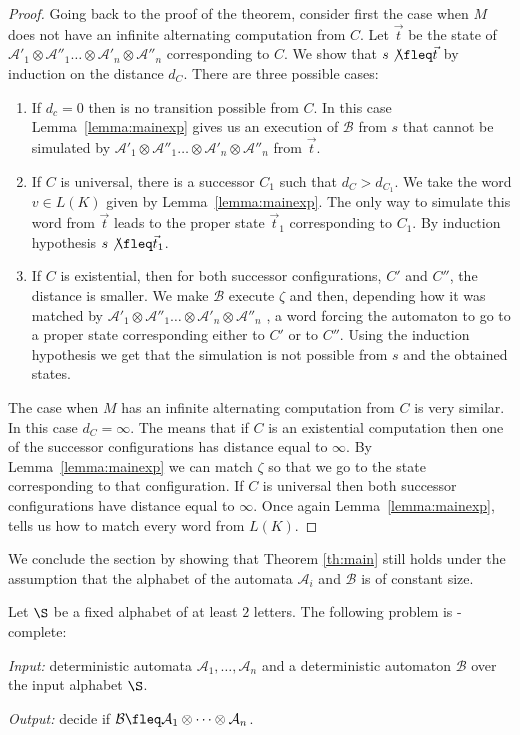 \documentclass{LMCS}
\theoremstyle{plain}\newtheorem{remark}{Remark}
\theoremstyle{plain}\newtheorem{lemma}[thm]{Lemma}
\renewcommand{\Aa}{\mathcal{A}}
\renewcommand{\Bb}{\mathcal{B}}
\newcommand{\vect}{\vec t}
\newcommand{\vAap}{\Aa'_1\otimes\Aa''_1\dots\otimes\Aa'_n\otimes\Aa''_n}
\newcommand{\choice}{\zeta}
\begin{document}
\begin{proof}
  Going back to the proof of the theorem, consider first the case when
  $M$ does not have an infinite alternating computation from $C$. Let
  $\vect$ be the state of $\vAap$ corresponding to $C$.  We show that
  $s\not\fleq \vect$ by induction on the distance $d_C$. There are
  three possible cases:
  \begin{enumerate}[$\bullet$]
  \item If $d_c=0$ then is no transition possible from $C$. In this case 
    Lemma~\ref{lemma:mainexp} gives us an execution of $\Bb$ from $s$ that
    cannot be simulated by $\vAap$ from $\vect$.
  \item If $C$ is universal, there is a successor $C_1$ such that
    $d_C>d_{C_1}$. We take the word $v\in L(K)$ given by
    Lemma~\ref{lemma:mainexp}. The only way to simulate this word from
    $\vect$ leads to the proper state $\vect_1$ corresponding to
    $C_1$. By induction hypothesis $s\not\fleq \vect_1$.
  \item If $C$ is existential, then for both successor configurations,
    $C'$ and $C''$, the distance is smaller. We make $\Bb$ execute
    $\choice$ and then, depending how it was matched by $\vAap$ , a
    word forcing the automaton to go to a proper state corresponding
    either to $C'$ or to $C''$. Using the induction hypothesis we get that
    the simulation is not possible from $s$ and the obtained states.
  \end{enumerate}

  The case when $M$ has an infinite alternating computation from $C$
  is very similar. In this case $d_C=\infty$. The means that if $C$ is
  an existential computation then one of the successor configurations
  has distance equal to $\infty$. By Lemma~\ref{lemma:mainexp} we can
  match $\choice$ so that we go to the state corresponding to that
  configuration. If $C$ is universal then both successor
  configurations have distance equal to $\infty$. Once again
  Lemma~\ref{lemma:mainexp}, tells us how to match every word from
  $L(K)$.
\end{proof}

We conclude the section by showing that Theorem \ref{th:main} still
holds under the assumption that the alphabet of the automata $\Aa_i$
and $\Bb$ is of
constant size.

\begin{thm} \label{th:mainc} Let $\S$ be a fixed alphabet of at
  least $2$ letters. The following problem is \EXPTIME-complete:

\emph{Input:} deterministic automata
$\Aa_1,\dots,\Aa_n$  and a deterministic automaton $\Bb$ over
the input alphabet $\S$.

\emph{Output:} decide if
$\Bb \fleq \Aa_1\otimes\dots\otimes\Aa_n$.

\end{thm}
\end{document}
